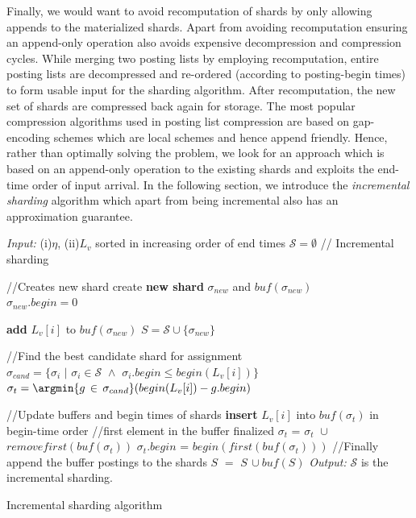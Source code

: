 Finally, we would want to avoid recomputation of shards by only allowing appends to the materialized shards. Apart from avoiding recomputation ensuring an append-only operation also avoids expensive decompression and compression cycles. While merging two posting lists by employing recomputation, entire posting lists are decompressed and re-ordered (according to posting-begin times) to form usable input for the sharding algorithm. After recomputation, the new set of shards are compressed back again for storage. The most popular compression algorithms used in posting list compression are based on gap-encoding schemes which are local schemes and hence append friendly. Hence, rather than optimally solving the problem, we look for an approach which is based on an append-only operation to the existing shards and exploits the end-time order of input arrival. In the following section, we introduce the \emph{incremental sharding} algorithm which apart from being incremental also has an approximation guarantee. 

 \begin{algorithm}[htb!]
   \begin{algorithmic}[1]
     \STATE  \emph{Input:} (i)$\eta$, (ii)$L_v$ sorted in increasing order of end times
     \STATE $\mathcal{S} = \emptyset$ \quad // Incremental sharding
 		
	\STATE {} 
	\STATE //Creates new shard
        		\STATE create \textbf{new shard} $\sigma_{new}$ and $buf(\sigma_{new})$ \\
				\STATE $\sigma_{new}.begin = 0$
			
			\STATE \textbf{add} $L_v[i]$ to $buf(\sigma_{new})$  
                     \STATE $S = \mathcal{S} \cup \{\sigma_{new}\}$
        \ENDIF

	\STATE 

			\STATE //Find the best candidate shard for assignment
			\STATE $\sigma_{cand} = \{ \sigma_i \,\,|\,\, \sigma_i \in \mathcal{S} \,\, \wedge  \,\,\sigma_i.begin \leq begin(L_v[i])\}$
			\STATE $\sigma_{t} =\argmin{g\, \in \,\sigma_{cand}} (begin(L_v[i]) - g.begin)$ 

		\STATE
		\STATE //Update buffers and begin times of shards
			\STATE \textbf{insert} $L_v[i]$ into $buf(\sigma_{t})$ in begin-time order			 
		\ENDIF
			\STATE  //first element in the buffer finalized
			\STATE $\sigma_{t}$ = $\sigma_{t} \,\, \cup$  $removefirst(buf(\sigma_{t}))$
			\STATE  $\sigma_{t}.begin$ = $begin(first (buf(\sigma_t)))$
		\ENDIF        
   	\ENDFOR 
	\STATE
	\STATE //Finally append the buffer postings to the shards
		\STATE	$S \,\,= \,\, S \,\cup buf(S)$
	\ENDFOR
\STATE
\STATE\emph{Output:} $\mathcal{S}$  is the incremental sharding.

   \end{algorithmic}
   \caption{Incremental sharding algorithm}
   \label{chap:sharding:alg:rs-inc}
 \end{algorithm}


